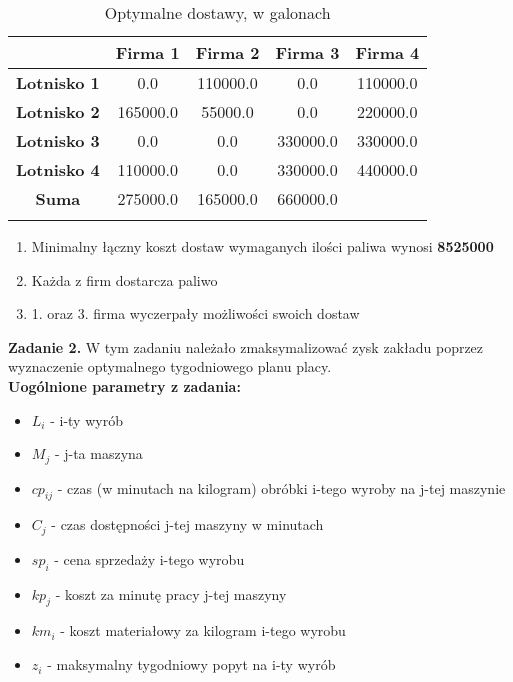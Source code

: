 \documentclass[15pt, a4paper]{article}
\begin{document}
\begin{longtable}{|c|c|c|c|c|}
\hline
           & \textbf{Firma 1} & \textbf{Firma 2} & \textbf{Firma 3} & \textbf{Firma 4} \\
\hline
    \textbf{Lotnisko 1} & 0.0      & 110000.0 & 0.0 & 110000.0      \\
\hline
    \textbf{Lotnisko 2} & 165000.0 & 55000.0  & 0.0 & 220000.0    \\
\hline
    \textbf{Lotnisko 3} & 0.0      & 0.0      & 330000.0 & 330000.0 \\
\hline
    \textbf{Lotnisko 4} & 110000.0 & 0.0      & 330000.0 & 440000.0 \\
\hline
    \textbf{Suma} & 275000.0 & 165000.0 & 660000.0 & \\ \hline
\caption{Optymalne dostawy, w galonach}
\end{longtable}

\vspace{0.5cm}

\begin{enumerate}
    \item Minimalny łączny koszt dostaw wymaganych ilości paliwa wynosi \textbf{8525000} 
    \item Każda z firm dostarcza paliwo
    \item 1. oraz 3. firma wyczerpały możliwości swoich dostaw
\end{enumerate}

\vspace{0.5cm}

\noindent\hrulefill

\vspace{0.5cm}


\noindent\textbf{Zadanie 2.} W tym zadaniu należało zmaksymalizować zysk zakładu poprzez wyznaczenie optymalnego tygodniowego planu placy.\\

\noindent\textbf{Uogólnione parametry z zadania:}

\begin{itemize}
    \item \( L_i \) - i-ty wyrób
    \item \( M_j \) - j-ta maszyna
    \item \( cp_{ij} \) - czas (w minutach na kilogram) obróbki i-tego wyroby na j-tej maszynie
    \item \( C_j \) - czas dostępności j-tej maszyny w minutach
    \item \( sp_i \) - cena sprzedaży i-tego wyrobu
    \item \( kp_j \) - koszt za minutę pracy j-tej maszyny
    \item \( km_{i} \) - koszt materiałowy za kilogram i-tego wyrobu
    \item \( z_{i} \) - maksymalny tygodniowy popyt na i-ty wyrób
\end{itemize}
\end{document}
